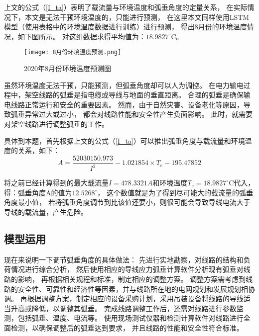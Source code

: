 \documentclass[withoutpreface,bwprint]{cumcmthesis}  %
\begin{document}
        上文的公式（\ref{I_ta}）表明了载流量与环境温度和弧垂角度的定量关系，
        在实际情况下，本文是无法干预环境温度的，只能进行预测，
        在这里本文同样使用LSTM模型（使用表格中的环境温度数据进行训练）进行预测，
        得出8月份的环境温度情况，如下图所示。
        对这组数据求得平均值为：$18.9827^\circ$C。

        \begin{figure}[htbp] 
                \centering  
                \texttt{[image: 8月份环境温度预测.png]}  
                \caption{2020年8月份环境温度预测图}
        \end{figure}        
        
        虽然环境温度无法干预，只能预测，但弧垂角度却可以人为调控。
        在电力输电过程中，架空线路的弧垂是指电缆或导线与地面的垂直距离。
        合理的弧垂是确保输电线路正常运行和安全的重要因素。
        然而，由于自然灾害、设备老化等原因，导致弧垂异常过大或过小，
        都会对线路性能和安全性产生负面影响。
        此时，就需要对架空线路进行调整弧垂的工作。

        具体到本题，首先根据上文的公式（\ref{I_ta}）可以推出弧垂角度与载流量和环境温度的关系，如下：
        \begin{equation}
            A = \frac{52030150.973}{I^2} - 1.021854 \times T_e - 195.47852
        \end{equation}

        将之前已经计算得到的最大载流量$I=478.3321A$和环境温度$T_e=18.9827^\circ$C代入，
        得：弧垂角度A的值为$12.5268^\circ$，
        这个数值就是为了得到尽可能大的载流量的弧垂角度最小值，
        若将弧垂角度调节到比该值还要小，则很可能会导致导线电流大于导线的载流量，产生危险。

        \subsection{模型运用}
        现在来说明一下调节弧垂角度的具体做法：
        先进行实地勘察，对线路的结构和负荷情况进行综合分析，
        然后使用相应的导线应力弧垂计算软件分析现有弧垂对线路的影响，
        再根据相关规程和标准，制定相应的调整方案。
        调整方案需考虑到线路的安全性、可靠性和经济性等因素，并与线路所在地的电网规划和发展规划相协调。
        再根据调整方案，制定相应的设备采购计划，采用吊装设备将线路的导线适当升高或降低，以调整其弧垂。
        完成线路调整工作后，还需对线路进行参数监测，包括弧垂、温度、电流等。
        使用现场测试仪器和检测计算软件对线路进行全面检测，以确保调整后的弧垂达到要求，
        并且线路的性能和安全性符合标准。
\end{document}
